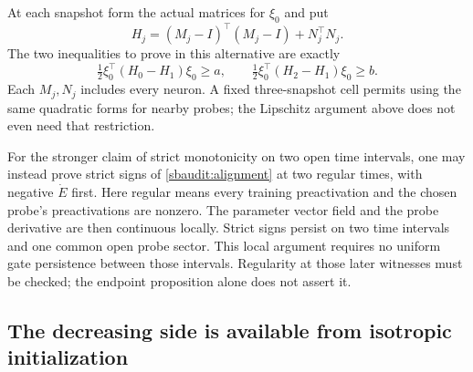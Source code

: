 \documentclass[11pt]{article}
\theoremstyle{remark}
\begin{document}
At each snapshot form the actual matrices for $\xi_0$ and put
\[
 H_j=(M_j-I)^\top(M_j-I)+N_j^\top N_j.
\]
The two inequalities to prove in this alternative are exactly
\begin{equation}\label{sbaudit:matrix-secants}
 \tfrac12\xi_0^\top(H_0-H_1)\xi_0\ge a,
 \qquad
 \tfrac12\xi_0^\top(H_2-H_1)\xi_0\ge b.
\end{equation}
Each $M_j,N_j$ includes every neuron. A fixed three-snapshot cell permits
using the same quadratic forms for nearby probes; the Lipschitz argument
above does not even need that restriction.

For the stronger claim of strict monotonicity on two open time intervals,
one may instead prove strict signs of \eqref{sbaudit:alignment} at two
regular times, with negative $\dot E$ first. Here regular means every
training preactivation and the chosen probe's preactivations are nonzero.
The parameter vector field and the probe derivative are then continuous
locally. Strict signs persist on two time intervals and one common open
probe sector. This local argument requires no uniform gate persistence
between those intervals. Regularity at those later witnesses must be
checked; the endpoint proposition alone does not assert it.

\subsection{The decreasing side is available from isotropic initialization}
\end{document}
